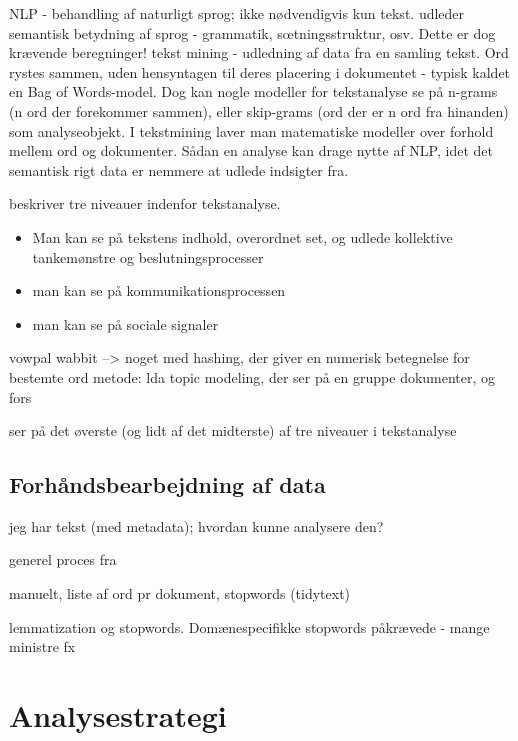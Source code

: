 NLP - behandling af naturligt sprog;  ikke nødvendigvis kun tekst. udleder semantisk betydning af sprog - grammatik, sœtningsstruktur, osv. Dette er dog krævende beregninger!
tekst mining - udledning af data fra en samling tekst. Ord rystes sammen, uden hensyntagen til deres placering i dokumentet - typisk kaldet en Bag of Words-model. Dog kan nogle modeller for tekstanalyse se på n-grams (n ord der forekommer sammen), eller skip-grams (ord der er n ord fra hinanden) som analyseobjekt. 
I tekstmining laver man matematiske modeller over forhold mellem ord og dokumenter.
Sådan en analyse kan drage nytte af NLP, idet det semantisk rigt data er nemmere at udlede indsigter fra.

\citeauthor{evansMachineTranslationMining2016} beskriver tre niveauer indenfor tekstanalyse.
\begin{itemize}
  \item
    Man kan se på tekstens indhold, overordnet set, og udlede kollektive tankemønstre og beslutningsprocesser
  \item
    man kan se på kommunikationsprocessen
  \item
    man kan se på sociale signaler
\end{itemize}

vowpal wabbit --> noget med hashing, der giver en numerisk betegnelse for bestemte ord
metode: lda topic modeling, der ser på en gruppe dokumenter, og fors

ser på det øverste (og lidt af det midterste) af tre niveauer i tekstanalyse \autocite{evansMachineTranslationMining2016}

\section{Forhåndsbearbejdning af data}\label{sec:preproc}

jeg har tekst (med metadata); hvordan kunne analysere den?

generel proces fra \autocite{kwartlerTextMiningPractice2017}

manuelt, liste af ord pr dokument, stopwords (tidytext)

lemmatization og stopwords.
Domænespecifikke stopwords påkrævede - mange ministre fx

\chapter{Analysestrategi}\label{chap:strategy}

